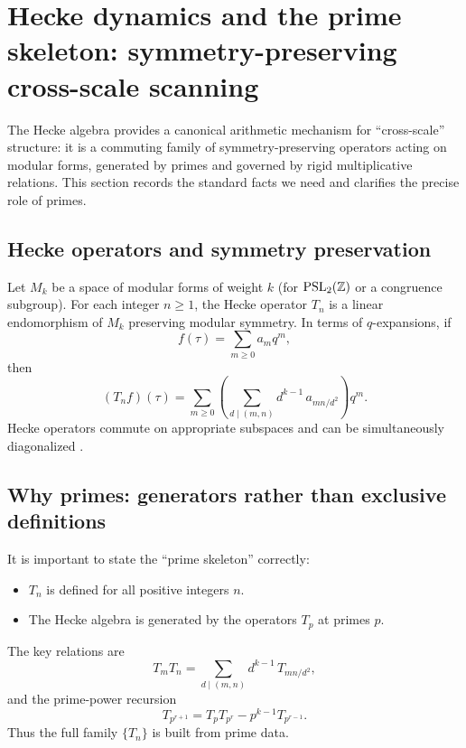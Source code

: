 \section{Hecke dynamics and the prime skeleton: symmetry-preserving cross-scale scanning}
\label{sec:hecke_dynamics}

The Hecke algebra provides a canonical arithmetic mechanism for ``cross-scale'' structure: it is a commuting family of symmetry-preserving operators acting on modular forms, generated by primes and governed by rigid multiplicative relations. This section records the standard facts we need and clarifies the precise role of primes.

\subsection{Hecke operators and symmetry preservation}
\label{sec:hecke_definition}

Let $M_k$ be a space of modular forms of weight $k$ (for $\mathrm{PSL}_2(\mathbb{Z})$ or a congruence subgroup). For each integer $n\ge 1$, the Hecke operator $T_n$ is a linear endomorphism of $M_k$ preserving modular symmetry. In terms of $q$-expansions, if
\begin{equation}
f(\tau)=\sum_{m\ge 0} a_m q^m,
\end{equation}
then
\begin{equation}
(T_n f)(\tau)
=\sum_{m\ge 0}\left(\sum_{d\mid (m,n)} d^{k-1}\, a_{mn/d^2}\right) q^m.
\label{eq:hecke_qexp_action}
\end{equation}
Hecke operators commute on appropriate subspaces and can be simultaneously diagonalized \cite{Apostol1990,DiamondShurman2005}.

\subsection{Why primes: generators rather than exclusive definitions}
\label{sec:why_primes}

It is important to state the ``prime skeleton'' correctly:
\begin{itemize}
  \item $T_n$ is defined for all positive integers $n$.
  \item The Hecke algebra is generated by the operators $T_p$ at primes $p$.
\end{itemize}
The key relations are
\begin{equation}
T_m T_n = \sum_{d\mid (m,n)} d^{k-1}\, T_{mn/d^2},
\label{eq:hecke_multiplication}
\end{equation}
and the prime-power recursion
\begin{equation}
T_{p^{r+1}} = T_p T_{p^r} - p^{k-1} T_{p^{r-1}}.
\label{eq:hecke_prime_power}
\end{equation}
Thus the full family $\{T_n\}$ is built from prime data.

